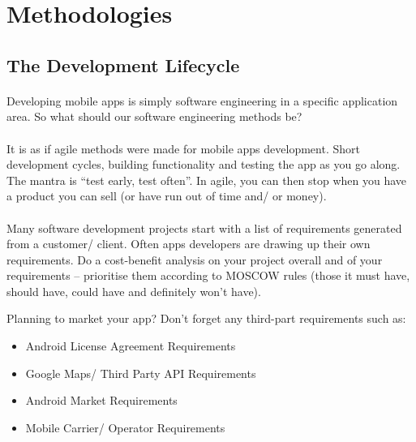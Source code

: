 

\section{Methodologies}
\subsection{The Development Lifecycle}
\paragraph{} Developing mobile apps is simply software engineering in a specific application area. So what should our software engineering methods be?

\paragraph{} It is as if agile methods were made for mobile apps development. Short development cycles, building functionality and testing the app as you go along. The mantra is “test early, test often”. In agile, you can then stop when you have a product you can sell (or have run out of time and/ or money).

\paragraph{} Many software development projects start with a list of requirements generated from a customer/ client.  Often apps developers are drawing up their own requirements. Do a cost-benefit analysis on your project overall and of your requirements – prioritise them according to MOSCOW rules (those it must have, should have, could have and definitely won't have).

\begin{framed}
Planning to market your app? Don't forget any third-part requirements such as:
\begin{itemize}
\item Android License Agreement Requirements
\item Google Maps/ Third Party API Requirements
\item Android Market Requirements
\item Mobile Carrier/ Operator Requirements
\end{itemize}
\end{framed}

